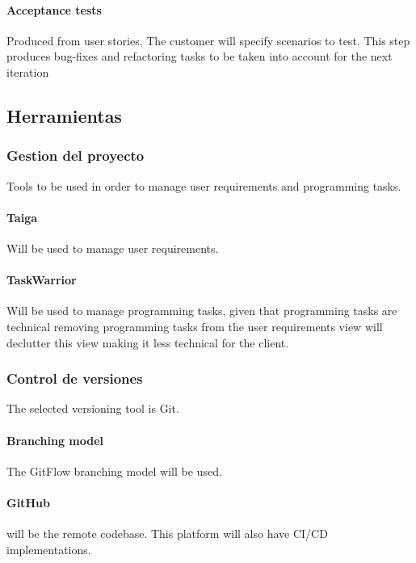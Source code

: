 \paragraph{Acceptance tests} Produced from user stories.
The customer will specify scenarios to test. This step produces bug-fixes and refactoring tasks to be taken into account for the next iteration

\subsection{Herramientas}
\subsubsection{Gestion del proyecto}
Tools to be used in order to manage user requirements and programming tasks.

\paragraph{Taiga} Will be used to manage user requirements.

\paragraph{TaskWarrior} Will be used to manage programming tasks, given that programming tasks are technical removing programming tasks from the user requirements view will declutter this view making it less technical for the client.

\subsubsection{Control de versiones}

The selected versioning tool is Git.

\paragraph{Branching model} The GitFlow branching model will be used.

\paragraph{GitHub} will be the remote codebase. This platform will also have CI/CD implementations.
